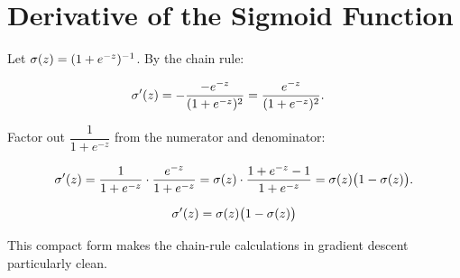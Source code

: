 \documentclass[12pt, a4paper]{article}
\begin{document}
\appendix
\section{Derivative of the Sigmoid Function}
\label{app:sigmoid-deriv}

Let $\sigma(z) = (1 + e^{-z})^{-1}$.  By the chain rule:

\begin{align*}
  \sigma'(z)
   & = -\frac{-e^{-z}}{(1+e^{-z})^2}
  = \frac{e^{-z}}{(1+e^{-z})^2}.
\end{align*}

Factor out $\dfrac{1}{1+e^{-z}}$ from the numerator and denominator:

\[
  \sigma'(z)
  = \frac{1}{1+e^{-z}} \cdot \frac{e^{-z}}{1+e^{-z}}
  = \sigma(z) \cdot \frac{1+e^{-z}-1}{1+e^{-z}}
  = \sigma(z)\bigl(1 - \sigma(z)\bigr).
\]

\begin{resultbox}
  \[
    \sigma'(z) = \sigma(z)\bigl(1 - \sigma(z)\bigr)
  \]
\end{resultbox}

This compact form makes the chain-rule calculations in gradient descent
particularly clean.
\end{document}
